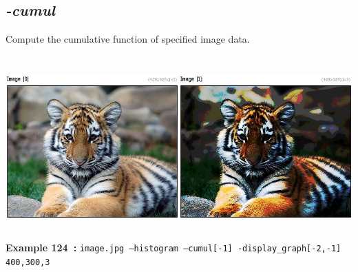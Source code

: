 \documentclass[a4paper,11pt,twoside]{book}
\begin{document}
\subsection{\emph{-cumul} }\vspace*{-0.5em}
Compute the cumulative function of specified image data.
\begin{center}\includegraphics[keepaspectratio=true,height=7cm,width=\textwidth]{img/gmic_def124.jpg}\\
{\footnotesize \textbf{Example 124~:} \texttt{image.jpg --histogram --cumul[-1] -display\_graph[-2,-1] 400,300,3}}
\end{center}
\end{document}

